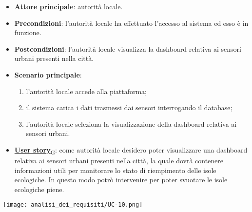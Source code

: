 \begin{itemize}
	\item \textbf{Attore principale}: autorità locale.
	\item \textbf{Precondizioni}: l'autorità locale ha effettuato l'accesso al sistema ed esso è in funzione.
	\item \textbf{Postcondizioni}: l'autorità locale visualizza la dashboard relativa
	      ai sensori urbani presenti nella città.
	\item \textbf{Scenario principale}:
	      \begin{enumerate}
		      \item l'autorità locale accede alla piattaforma;
		      \item il sistema carica i dati trasmessi dai sensori interrogando il database;
		      \item l'autorità locale seleziona la visualizzazione della dashboard relativa ai sensori urbani.
	      \end{enumerate}
	\item \href{https://7last.github.io/docs/rtb/documentazione-interna/glossario\#user-story}{\textbf{User story}\textsubscript{G}}:
	      come autorità locale desidero poter visualizzare una dashboard relativa ai sensori urbani presenti nella città, la quale
	      dovrà contenere informazioni utili per monitorare lo stato di riempimento delle isole ecologiche. In questo modo potrò intervenire
	      per poter svuotare le isole ecologiche piene.
\end{itemize}
\begin{center}
	\texttt{[image: analisi\_dei\_requisiti/UC-10.png]}
\end{center}


